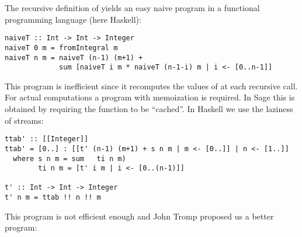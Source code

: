 \documentclass{jfp1}
\begin{document}
The recursive definition of  yields an easy naive program in a functional
programming language (here \textsf{Haskell}):
\begin{verbatim}
naiveT :: Int -> Int -> Integer
naiveT 0 m = fromIntegral m
naiveT n m = naiveT (n-1) (m+1) + 
             sum [naiveT i m * naiveT (n-1-i) m | i <- [0..n-1]]
\end{verbatim}
This program is inefficient since it recomputes the values of  at each recursive
call.   For actual computations a program with memoization is required.  In
\textsf{Sage}  this is obtained by requiring the function to be ``cached''. In
\textsf{Haskell} we use the laziness of streams:
\begin{verbatim}
ttab' :: [[Integer]]
ttab' = [0..] : [[t' (n-1) (m+1) + s n m | m <- [0..]] | n <- [1..]]
  where s n m = sum   ti n m)
        ti n m = [t' i m | i <- [0..(n-1)]]

t' :: Int -> Int -> Integer
t' n m = ttab !! n !! m
\end{verbatim}
This program is not efficient enough and John Tromp proposed us a better program:
\end{document}
